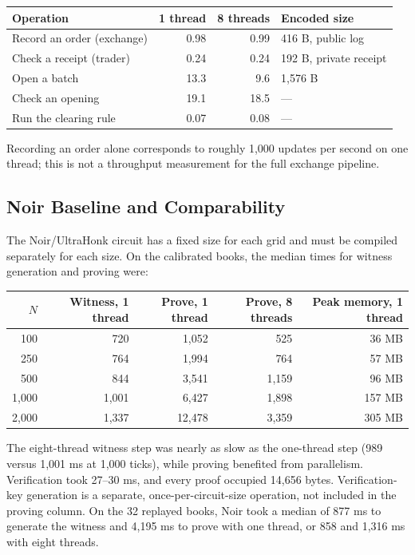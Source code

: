 \begin{center}
\small
\setlength{\tabcolsep}{3pt}
\begin{tabular}{@{}lrrl@{}}
\toprule
Operation & 1 thread & 8 threads & Encoded size \\
\midrule
Record an order (exchange) & 0.98 & 0.99 & 416 B, public log \\
Check a receipt (trader) & 0.24 & 0.24 & 192 B, private receipt \\
Open a batch & 13.3 & 9.6 & 1,576 B \\
Check an opening & 19.1 & 18.5 & --- \\
Run the clearing rule & 0.07 & 0.08 & --- \\
\bottomrule
\end{tabular}
\end{center}

Recording an order alone corresponds to roughly 1,000 updates per second on one thread; this is not a throughput measurement for the full exchange pipeline.

\subsection{Noir Baseline and Comparability}
\label{app:zq-bench-noir}

The Noir/UltraHonk circuit has a fixed size for each grid and must be compiled separately for each size. On the calibrated books, the median times for witness generation and proving were:

\begin{center}
\small
\setlength{\tabcolsep}{3pt}
\begin{tabular}{@{}rrrrr@{}}
\toprule
$N$ & Witness, 1 thread & Prove, 1 thread & Prove, 8 threads & Peak memory, 1 thread \\
\midrule
100 & 720 & 1,052 & 525 & 36 MB \\
250 & 764 & 1,994 & 764 & 57 MB \\
500 & 844 & 3,541 & 1,159 & 96 MB \\
1,000 & 1,001 & 6,427 & 1,898 & 157 MB \\
2,000 & 1,337 & 12,478 & 3,359 & 305 MB \\
\bottomrule
\end{tabular}
\end{center}

The eight-thread witness step was nearly as slow as the one-thread step (989 versus 1,001 ms at 1,000 ticks), while proving benefited from parallelism. Verification took 27--30 ms, and every proof occupied 14,656 bytes. Verification-key generation is a separate, once-per-circuit-size operation, not included in the proving column. On the 32 replayed books, Noir took a median of 877 ms to generate the witness and 4,195 ms to prove with one thread, or 858 and 1,316 ms with eight threads.

